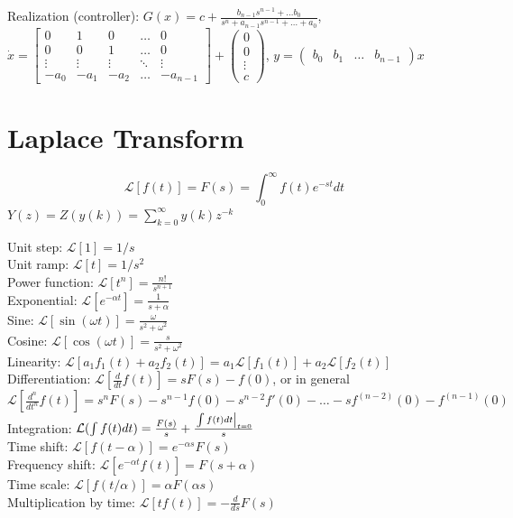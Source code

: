 \documentclass[11pt]{article}
\begin{document}
Realization (controller):
$G(x) = c + \frac{b_{n-1}s^{n-1} + \dots b_0}{s^n + a_{n-1}s^{n-1} + \dots + a_0}$,\\
$\dot{x} = \begin{bmatrix}
    0 & 1 & 0 & \dots & 0 \\
    0 & 0 & 1 & \dots & 0 \\
    \vdots & \vdots & \vdots & \ddots & \vdots \\
    -a_0 & -a_1 & -a_2 & \dots & -a_{n-1}
\end{bmatrix} + \begin{pmatrix}
    0 \\ 0 \\ \vdots \\ c
\end{pmatrix}$, $y = \begin{pmatrix}
    b_0 & b_1 & \dots & b_{n-1}
\end{pmatrix}x$

\section{Laplace Transform}
$$\mathcal{L}[f(t)] = F(s) = \int_{0} ^ \infty f(t) e^{-st} dt $$
$Y(z) = Z(y(k)) = \sum_{k = 0} ^ \infty y(k)z^{-k}$

Unit step: $\mathcal{L}[1] = 1/s$\\
Unit ramp: $\mathcal{L}[t] = 1/s^2$\\
Power function: $\mathcal{L}[t^n] = \frac{n!}{s^{n+1}}$\\
Exponential: $\mathcal{L}[e^{-\alpha t}] = \frac{1}{s + \alpha}$\\
Sine: $\mathcal{L}[\sin(\omega t)] = \frac{\omega}{s^2 + \omega^2}$\\
Cosine: $\mathcal{L}[\cos(\omega t)] = \frac{s}{s^2 + \omega^2}$\\

Linearity: $\mathcal{L}[a_1 f_1(t) + a_2 f_2(t)] = a_1 \mathcal{L}[f_1(t)] + a_2 \mathcal{L}[f_2(t)]$\\
Differentiation: $\mathcal{L}[\frac{d}{dt} f(t)] = sF(s) - f(0)$, or in general
$\mathcal{L}[\frac{d^n}{dt^n} f(t)] = s^nF(s) - s^{n-1}f(0) - s^{n-2}f'(0) - \dots - s f^{(n-2)}(0) - f^{(n-1)}(0)$\\
Integration: $\mathcal{L}(\int f(t)dt) = \frac{F(s)}{s} + \frac{\left.\int f(t)dt\right\rvert_{t=0}^{}}{s}$\\
Time shift: $\mathcal{L}[f(t-\alpha)] = e^{-\alpha s}F(s)$\\
Frequency shift: $\mathcal{L}[e^{-\alpha t}f(t)] = F(s + \alpha)$\\
Time scale: $\mathcal{L}[f(t/\alpha)] = \alpha F (\alpha s)$\\
Multiplication by time: $\mathcal{L}[tf(t)] = - \frac{d}{ds}F(s)$\\
\end{document}
